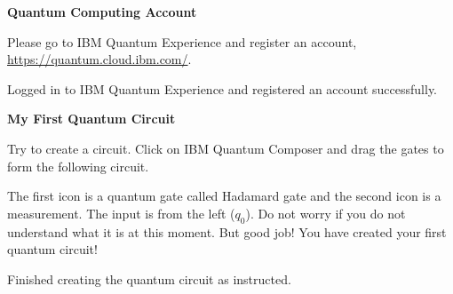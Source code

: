 \documentclass[a4paper, 10pt]{article}
\begin{document}
\subject
{}

\begin{problem}
\textbf{Quantum Computing Account}
\par Please go to IBM Quantum Experience and register an account, \url{https://quantum.cloud.ibm.com/}.
\end{problem}

\begin{solution}
	Logged in to IBM Quantum Experience and registered an account successfully.
\end{solution}

\begin{problem}
\textbf{My First Quantum Circuit}
\par Try to create a circuit. Click on IBM Quantum Composer and drag the gates to form the following circuit.


The first icon is a quantum gate called Hadamard gate and the second icon is a measurement.
The input is from the left ($q_0$).
Do not worry if you do not understand what it is at this moment.
But good job! You have created your first quantum circuit!
\end{problem}

\begin{solution}
	Finished creating the quantum circuit as instructed.
\end{solution}
\end{document}

